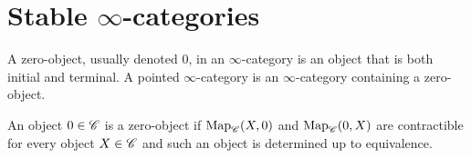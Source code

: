 \documentclass[../../thesis.tex]{subfiles}
\begin{document}
\section{Stable $\infty$-categories}
\begin{definition}
    A zero-object, usually denoted $0$, in an $\infty$-category is an object that is both initial and terminal.
    A pointed $\infty$-category is an $\infty$-category containing a zero-object.
\end{definition}
\begin{remark}
    An object $0\in \mathscr{C}$ is a zero-object if $\mathrm{Map}_{\mathscr{C}}(X,0)$ and $\mathrm{Map}_{\mathscr{C}}(0,X)$ are contractible for every object $X\in \mathscr{C}$ and such an object is determined up to equivalence.
\end{remark}
\end{document}

